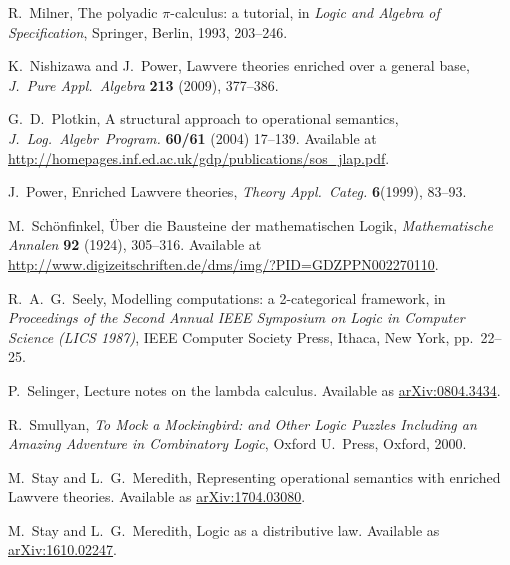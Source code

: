 \documentclass{amsart}
\theoremstyle{definition}
\begin{document}
\begin{thebibliography}{100}
 R.\ Milner, The polyadic {$\pi$}-calculus: a tutorial, in \textsl{Logic and Algebra of Specification}, Springer, Berlin, 1993, 203--246.

 K.\ Nishizawa and J.\ Power, Lawvere theories enriched over a general base, \textsl{J.\ Pure Appl.\ Algebra}  \textbf{213} (2009), 377--386.

 G.\ D.\ Plotkin, A structural approach to operational semantics, \textsl{J.\ Log.\ Algebr\ Program.} \textbf{60/61} (2004) 17--139.  Available at \href{http://homepages.inf.ed.ac.uk/gdp/publications/sos_jlap.pdf}{http://homepages.inf.ed.ac.uk/gdp/publications/sos\_jlap.pdf}.

 J.\ Power, Enriched Lawvere theories, \textsl{Theory Appl.\ Categ.} \textbf{6}(1999), 83--93.

 M.\ Sch\"{o}nfinkel, \"Uber die Bausteine der mathematischen Logik, 
 \textsl{Mathematische Annalen} \textbf{92} (1924), 305--316.  Available at \href{http://www.digizeitschriften.de/dms/img/?PID=GDZPPN002270110}{http://www.digizeitschriften.de/dms/img/?PID=GDZPPN002270110}.
 
 R.\ A.\ G.\ Seely, Modelling computations: a 2-categorical framework, in
\textsl{Proceedings of the Second Annual IEEE Symposium on Logic in Computer Science (LICS 1987)}, IEEE Computer Society Press, Ithaca, New York, pp.\ 22--25.
 
  P.\ Selinger, Lecture notes on the lambda calculus.  Available as 
 \href{https://arxiv.org/abs/0804.3434}{arXiv:0804.3434}.

 R.\ Smullyan, \textsl{To Mock a Mockingbird: and Other Logic Puzzles Including an Amazing Adventure in Combinatory Logic}, Oxford U.\ Press, Oxford, 2000.
	
 M.\ Stay and L.\ G.\ Meredith, Representing operational semantics 
with enriched Lawvere theories.  Available as
\href{https://arxiv.org/abs/1704.03080}{arXiv:1704.03080}.

 M.\ Stay and L.\ G.\ Meredith, Logic as a distributive law.  Available as \href{https://arxiv.org/abs/1610.02247}{arXiv:1610.02247}.

\end{thebibliography}
\end{document}
